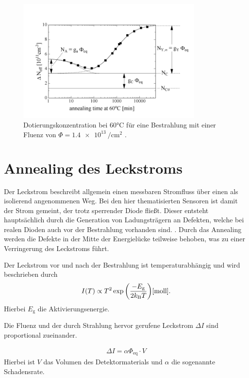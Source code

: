 \begin{figure}
  \includegraphics[width=0.83\textwidth]{logos/n_eff_beispiel.PNG}
  \caption{Dotierungskonzentration bei 60°C für eine Bestrahlung mit einer Fluenz
  von $\Phi=\SI{1.4e13}{\per\centi\meter\squared}$ .\cite{moll}}
  \label{fig:n_eff_beispiel}
\end{figure}



\section{Annealing des Leckstroms}
Der Leckstrom beschreibt allgemein einen messbaren Stromfluss über einen als isolierend
angenommenen Weg. Bei den hier thematisierten Sensoren ist damit der Strom gemeint, der trotz sperrender
Diode fließt. Dieser entsteht hauptsächlich durch die Generation von Ladungsträgern an Defekten, welche
bei realen Dioden auch vor der Bestrahlung vorhanden sind. \cite{moll}.
Durch das Annealing werden die Defekte in der Mitte der Energielücke teilweise behoben,
was zu einer Verringerung des Leckstroms führt.

Der Leckstrom vor und nach der Bestrahlung ist temperaturabhängig und wird
beschrieben durch
\begin{align}
  I(T) \propto T^2 \exp{\left(\frac{-E_{\mathrm{g}}}{2 k_{\mathrm{B}}T}\right)} \text{\cite{moll}} \label{eqn:Chilingarov_2013}.
\end{align}
Hierbei $E_{\mathrm{g}}$ die Aktivierungsenergie.

Die Fluenz und der durch Strahlung hervor gerufene Leckstrom $\Delta I$ sind
proportional zueinander.


\begin{align}
  \Delta I = \alpha \Phi_{\mathrm{eq}} \cdot V
\end{align}
Hierbei ist $V$ das Volumen des Detektormaterials und $\alpha$ die
sogenannte Schadensrate.



